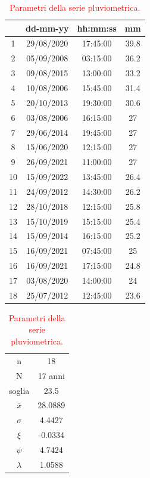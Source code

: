 \begin{table}[H]
    \caption*{Evento pluviometrico di 30 minuti.}
    \begin{minipage}{.5\linewidth}
      \caption{\textcolor{red}{Campione della serie pluviometrica.}}
      \centering
        \begin{tabular}{cccc}
            \toprule
            & dd-mm-yy   & hh:mm:ss & mm \\
            \midrule
         1  & 29/08/2020 & 17:45:00 & 39.8 \\
         2  & 05/09/2008 & 03:15:00 & 36.2 \\
         3  & 09/08/2015 & 13:00:00 & 33.2 \\
         4  & 10/08/2006 & 15:45:00 & 31.4 \\
         5  & 20/10/2013 & 19:30:00 & 30.6 \\
         6  & 03/08/2006 & 16:15:00 & 27   \\
         7  & 29/06/2014 & 19:45:00 & 27   \\
         8  & 15/06/2020 & 12:15:00 & 27   \\
         9  & 26/09/2021 & 11:00:00 & 27   \\
         10 & 15/09/2022 & 13:45:00 & 26.4 \\
         11 & 24/09/2012 & 14:30:00 & 26.2 \\
         12 & 28/10/2018 & 12:15:00 & 25.8 \\
         13 & 15/10/2019 & 15:15:00 & 25.4 \\
         14 & 15/09/2014 & 16:15:00 & 25.2 \\
         15 & 16/09/2021 & 07:45:00 & 25   \\
         16 & 16/09/2021 & 17:15:00 & 24.8 \\
         17 & 03/08/2020 & 14:00:00 & 24   \\
         18 & 25/07/2012 & 12:45:00 & 23.6 \\
         \bottomrule
        \end{tabular}
    \end{minipage}%
    \begin{minipage}{.5\linewidth}
      \centering
        \caption{\textcolor{red}{Parametri della serie pluviometrica.}}
        \begin{tabular}{cc}
            \toprule
        n        &     18    \\
        N        & 17 anni \\
        soglia   &    23.5     \\
        $\bar{x}$ &  28.0889      \\
        $\sigma$ &    4.4427     \\
        $\xi$      &  -0.0334     \\
        $\psi$      &  4.7424   \\
        $\lambda$   &  1.0588  \\
    \bottomrule     
        \end{tabular}
    \end{minipage} 
\end{table}

